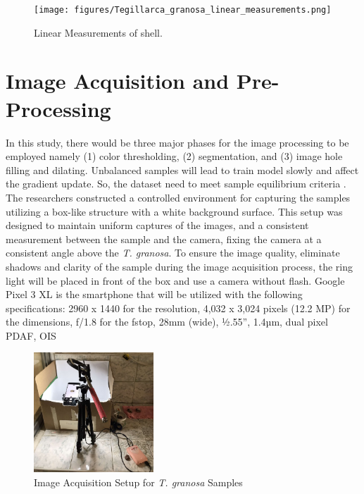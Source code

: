 \begin{figure}[!htbp]
	\centering
	\texttt{[image: figures/Tegillarca\_granosa\_linear\_measurements.png]}
	\caption{Linear Measurements of  \Tegillarcagranosa shell.}
	\label{fig:linear_measurements}
\end{figure}

\section{Image Acquisition and Pre-Processing}
\label{sec:imageprocess}
In this study, there would be three major phases for the image processing to be employed namely (1) color thresholding, (2) segmentation, and (3) image hole filling and dilating. Unbalanced samples will lead to train model slowly and affect the gradient update. So, the dataset need to meet sample equilibrium criteria \cite{cui2020}. The researchers constructed a controlled environment for capturing the samples utilizing a box-like structure with a white background surface. This setup was designed to maintain uniform captures of the images, and a consistent measurement between the sample and the camera, fixing the camera at a consistent angle above the \textit{T. granosa}. To ensure the image quality, eliminate shadows and clarity of the sample during the image acquisition process, the ring light will be placed in front of the box and use a camera without flash. Google Pixel 3 XL is the smartphone that will be utilized with the following specifications: 2960 x 1440 for the resolution, 4,032 x 3,024 pixels (12.2 MP) for the dimensions, f/1.8 for the fstop, 28mm (wide), ½.55”, 1.4µm, dual pixel PDAF, OIS \cite{concepcion2023}

\begin{figure}[!htbp]
	\centering
	\includegraphics[width=0.4\textwidth]{figures/setup.jpg}
	\caption{Image Acquisition Setup for \textit{T. granosa} Samples}
	\label{fig: setup}
\end{figure}

\newpage
